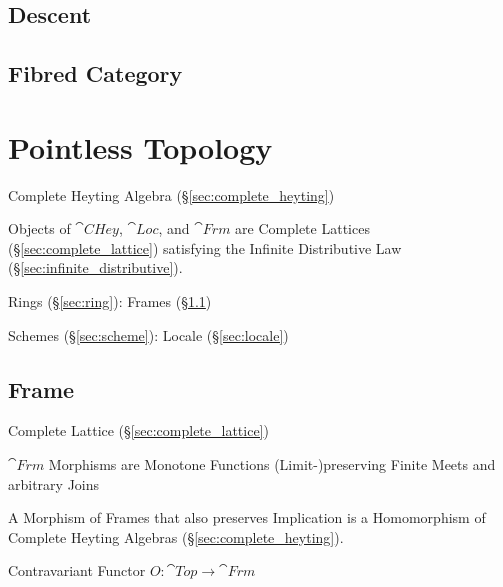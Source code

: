 \subsection{Descent}\label{sec:descent}

\subsection{Fibred Category}\label{sec:fibred_category}



\section{Pointless Topology}\label{sec:pointless_topology}

Complete Heyting Algebra (\S\ref{sec:complete_heyting})

Objects of $\cat{CHey}$, $\cat{Loc}$, and $\cat{Frm}$ are Complete
Lattices (\S\ref{sec:complete_lattice}) satisfying the Infinite
Distributive Law (\S\ref{sec:infinite_distributive}).

Rings (\S\ref{sec:ring}): Frames (\S\ref{sec:frame})

Schemes (\S\ref{sec:scheme}): Locale (\S\ref{sec:locale})



\subsection{Frame}\label{sec:frame}

Complete Lattice (\S\ref{sec:complete_lattice})

$\cat{Frm}$ Morphisms are Monotone Functions (Limit-)preserving Finite
Meets and arbitrary Joins

A Morphism of Frames that also preserves Implication is a Homomorphism
of Complete Heyting Algebras (\S\ref{sec:complete_heyting}).

Contravariant Functor $O : \cat{Top} \rightarrow \cat{Frm}$

